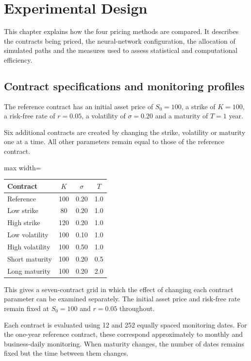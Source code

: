 \chapter{Experimental Design}

This chapter explains how the four pricing methods are compared. It describes the contracts being priced, the neural-network configuration, the allocation of simulated paths and the measures used to assess statistical and computational efficiency.

\section{Contract specifications and monitoring profiles}

The reference contract has an initial asset price of $S_0=100$, a strike of $K=100$, a risk-free rate of $r=0.05$, a volatility of $\sigma=0.20$ and a maturity of $T=1$ year.

Six additional contracts are created by changing the strike, volatility or maturity one at a time. All other parameters remain equal to those of the reference contract.

\begin{table}[h]
\centering
\begin{adjustbox}{max width=\textwidth}
\begin{tabular}{lccc}
\hline
Contract & $K$ & $\sigma$ & $T$ \\
\hline
Reference & 100 & 0.20 & 1.0 \\
Low strike & 80 & 0.20 & 1.0 \\
High strike & 120 & 0.20 & 1.0 \\
Low volatility & 100 & 0.10 & 1.0 \\
High volatility & 100 & 0.50 & 1.0 \\
Short maturity & 100 & 0.20 & 0.5 \\
Long maturity & 100 & 0.20 & 2.0 \\
\hline
\end{tabular}
\end{adjustbox}
\end{table}

This gives a seven-contract grid in which the effect of changing each contract parameter can be examined separately. The initial asset price and risk-free rate remain fixed at $S_0=100$ and $r=0.05$ throughout.

Each contract is evaluated using 12 and 252 equally spaced monitoring dates. For the one-year reference contract, these correspond approximately to monthly and business-daily monitoring. When maturity changes, the number of dates remains fixed but the time between them changes.

